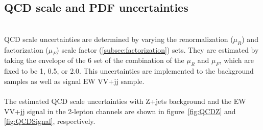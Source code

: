 \subsection{QCD scale and PDF uncertainties}
\noindent\textbf{}\\
QCD scale uncertainties are determined by varying the renormalization ($\mu_R$) and factorization ($\mu_F$) scale factor (\ref{subsec:factorization}) sets. 
They are estimated by taking the envelope of the 6 set of the combination of the $\mu_R$ and $\mu_F$, which are fixed to be 1, 0.5, or 2.0. 
This uncertainties are implemented to the background samples as well as signal EW VV+jj sample.\\ \\
%
The estimated QCD scale uncertainties with Z+jets background and the EW VV+jj signal in the 2-lepton channels are shown in figure~\ref{fig:QCDZ} and \ref{fig:QCDSignal}, respectively.
